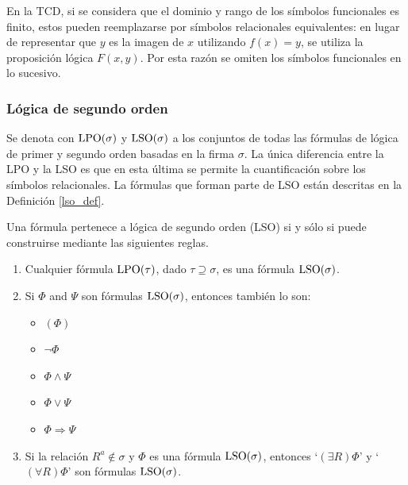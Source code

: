 En la TCD, si se considera que el dominio y rango de los símbolos funcionales
es finito, estos pueden reemplazarse por símbolos relacionales
equivalentes: en lugar de representar que $y$ es la imagen de $x$ utilizando
$f(x) = y$, se utiliza la proposición lógica $F(x, y)$.
Por esta razón se omiten los símbolos funcionales en lo sucesivo.

\subsubsection{Lógica de segundo orden}
Se denota con $\text{LPO}(\sigma)$ y $\text{LSO}(\sigma)$ a los conjuntos de todas las
fórmulas de lógica de primer y segundo orden basadas en la firma $\sigma$.
La única diferencia entre la LPO y la LSO es que en esta última se permite la
cuantificación sobre los símbolos relacionales. La fórmulas que forman parte
de LSO están descritas en la Definición \ref{lso_def}.

\begin{definition} Una fórmula pertenece a lógica de segundo orden (LSO) si y
sólo si puede construirse mediante las siguientes reglas.
\label{lso_def}
\begin{enumerate}

\item Cualquier fórmula $\text{LPO}(\tau)$, dado $\tau\supseteq\sigma$, es una
fórmula $\text{LSO}(\sigma)$.
\item Si $\Phi$ and $\Psi$ son fórmulas $\text{LSO}(\sigma)$, entonces también lo
son:
 \begin{itemize}
    \item $(\Phi)$
    \item $\neg\Phi$
    \item $\Phi\land\Psi$
    \item $\Phi\lor\Psi$
    \item $\Phi\Rightarrow\Psi$
  \end{itemize}
\item Si la relación $R^a\notin\sigma$ y $\Phi$ es una fórmula $\text{LSO}(\sigma)$,
  entonces `$(\exists R)\Phi$' y `$(\forall R)\Phi$' son fórmulas $\text{LSO}(\sigma)$.
\end{enumerate}
\end{definition}

